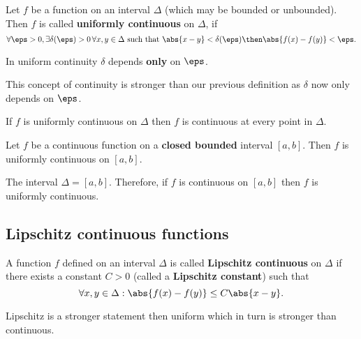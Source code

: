 \documentclass[12pt, a4paper]{article}
\begin{document}
\begin{definition}
Let \(f\) be a function on an interval \(\Delta\) (which may be bounded or unbounded). Then \(f\) is called \textbf{uniformly continuous} on \(\Delta\), if 
\[\forall \eps > 0, \exists \delta(\eps)>0 \, \forall x,y \in \Delta \text{ such that } \abs{x-y}<\delta(\eps) \then \abs{f(x)-f(y)}<\eps.\]
\end{definition}

\begin{mdnote}
    In uniform continuity \(\delta\) depends \textbf{only} on \(\eps\).
\end{mdnote}

\begin{mdremark}
    This concept of continuity is stronger than our previous definition as \(\delta\) now only depends on \(\eps\).
\end{mdremark}

\begin{corollary}
    If \(f\) is uniformly continuous on \(\Delta\) then \(f\) is continuous at every point in \(\Delta\).
\end{corollary}

\begin{mdthm}
    Let \(f\) be a continuous function on a \textbf{closed bounded} interval \([a,b]\). Then \(f\) is uniformly continuous on \([a,b]\).
\end{mdthm}

\begin{mdnote}
    The interval \(\Delta=[a,b]\). Therefore, if \(f\) is continuous on \([a,b]\) then \(f\) is uniformly continuous.
\end{mdnote}

\subsection{Lipschitz continuous functions}

\begin{definition}
    A function \(f\) defined on an interval \(\Delta\) is called \textbf{Lipschitz continuous} on \(\Delta\) if there exists a constant \(C>0\) (called a \textbf{Lipschitz constant}) such that 
    \[\forall x,y \in \Delta: \abs{f(x)-f(y)}\leq C\abs{x-y}.\]
\end{definition}

\begin{mdnote}
    Lipschitz is a stronger statement then uniform which in turn is stronger than continuous.
\end{mdnote}
\end{document}
